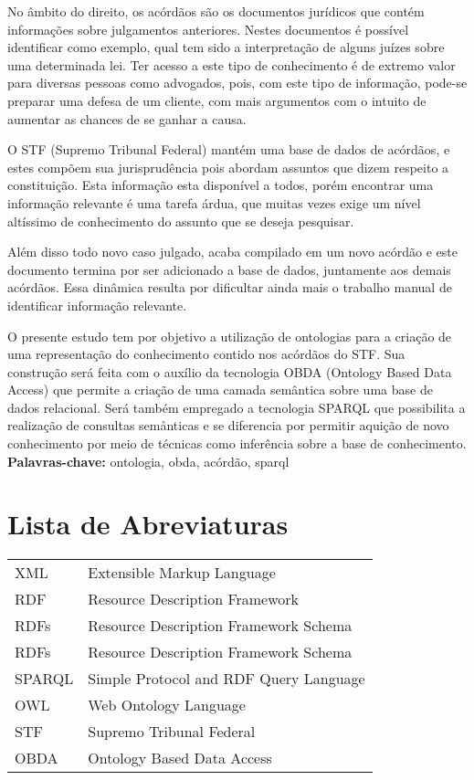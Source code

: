 \documentclass[11pt,twoside,a4paper]{book}
\begin{document}
No âmbito do direito, os acórdãos são os documentos jurídicos que contém 
informações sobre julgamentos anteriores. Nestes documentos é possível 
identificar como exemplo, qual tem sido a interpretação de alguns juízes sobre 
uma determinada lei. Ter acesso a este tipo de conhecimento é de extremo valor 
para diversas pessoas como advogados, pois, com este tipo de informação, 
pode-se preparar uma defesa de um cliente, com mais argumentos com o intuito 
de aumentar as chances de se ganhar a causa.

O STF (Supremo Tribunal Federal) mantém uma base de dados de acórdãos, e estes
compõem sua jurisprudência pois abordam assuntos que dizem respeito a 
constituição. Esta informação esta disponível a todos, porém encontrar uma
informação relevante é uma tarefa árdua, que muitas vezes exige um nível 
altíssimo de conhecimento do assunto que se deseja pesquisar.

Além disso todo novo caso julgado, acaba compilado em um novo acórdão e este
documento termina por ser adicionado a base de dados, juntamente aos demais 
acórdãos. Essa dinâmica resulta por dificultar ainda mais o trabalho manual 
de identificar informação relevante.

O presente estudo tem por objetivo a utilização de ontologias para a criação de
uma representação do conhecimento contido nos acórdãos do STF. Sua construção 
será feita com o auxílio da tecnologia OBDA (Ontology Based Data Access) que 
permite a criação de uma camada semântica sobre uma base de dados relacional. 
Será também empregado a tecnologia SPARQL que possibilita a realização de 
consultas semånticas e se diferencia por permitir aquição de novo conhecimento 
por meio de técnicas como inferência sobre a base de conhecimento.
\\

\noindent \textbf{Palavras-chave:} ontologia, obda, acórdão, sparql

\tableofcontents    %

\chapter{Lista de Abreviaturas}
\begin{tabular}{ll}
    XML & Extensible Markup Language \\
    RDF & Resource Description Framework \\
    RDFs & Resource Description Framework Schema \\
    RDFs & Resource Description Framework Schema \\
    SPARQL & Simple Protocol and RDF Query Language \\
    OWL & Web Ontology Language \\
    STF & Supremo Tribunal Federal \\
    OBDA & Ontology Based Data Access \\
\end{tabular}
\end{document}
